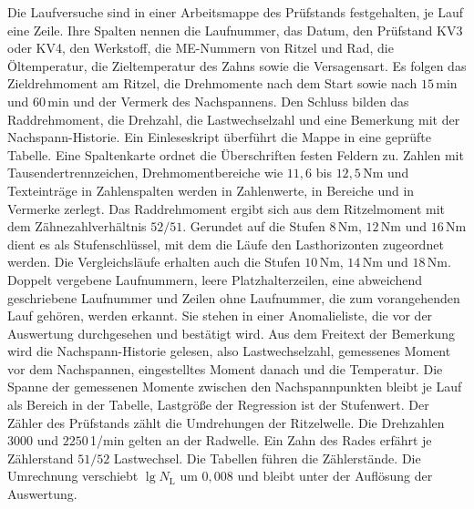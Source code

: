 Die Laufversuche sind in einer Arbeitsmappe des Prüfstands festgehalten, je Lauf eine Zeile. Ihre Spalten nennen die Laufnummer, das Datum, den Prüfstand KV3 oder KV4, den Werkstoff, die ME-Nummern von Ritzel und Rad, die Öltemperatur, die Zieltemperatur des Zahns sowie die Versagensart. Es folgen das Zieldrehmoment am Ritzel, die Drehmomente nach dem Start sowie nach $15$\,min und $60$\,min und der Vermerk des Nachspannens. Den Schluss bilden das Raddrehmoment, die Drehzahl, die Lastwechselzahl und eine Bemerkung mit der Nachspann-Historie. Ein Einleseskript überführt die Mappe in eine geprüfte Tabelle. Eine Spaltenkarte ordnet die Überschriften festen Feldern zu. Zahlen mit Tausendertrennzeichen, Drehmomentbereiche wie $11{,}6$ bis $12{,}5$\,Nm und Texteinträge in Zahlenspalten werden in Zahlenwerte, in Bereiche und in Vermerke zerlegt. Das Raddrehmoment ergibt sich aus dem Ritzelmoment mit dem Zähnezahlverhältnis $52/51$. Gerundet auf die Stufen $8$\,Nm, $12$\,Nm und $16$\,Nm dient es als Stufenschlüssel, mit dem die Läufe den Lasthorizonten zugeordnet werden. Die Vergleichsläufe erhalten auch die Stufen $10$\,Nm, $14$\,Nm und $18$\,Nm. Doppelt vergebene Laufnummern, leere Platzhalterzeilen, eine abweichend geschriebene Laufnummer und Zeilen ohne Laufnummer, die zum vorangehenden Lauf gehören, werden erkannt. Sie stehen in einer Anomalieliste, die vor der Auswertung durchgesehen und bestätigt wird. Aus dem Freitext der Bemerkung wird die Nachspann-Historie gelesen, also Lastwechselzahl, gemessenes Moment vor dem Nachspannen, eingestelltes Moment danach und die Temperatur. Die Spanne der gemessenen Momente zwischen den Nachspannpunkten bleibt je Lauf als Bereich in der Tabelle, Lastgröße der Regression ist der Stufenwert. Der Zähler des Prüfstands zählt die Umdrehungen der Ritzelwelle. Die Drehzahlen $3000$ und $2250$\,1/min gelten an der Radwelle. Ein Zahn des Rades erfährt je Zählerstand $51/52$ Lastwechsel. Die Tabellen führen die Zählerstände. Die Umrechnung verschiebt $\lg N_{\mathrm{L}}$ um $0{,}008$ und bleibt unter der Auflösung der Auswertung.

